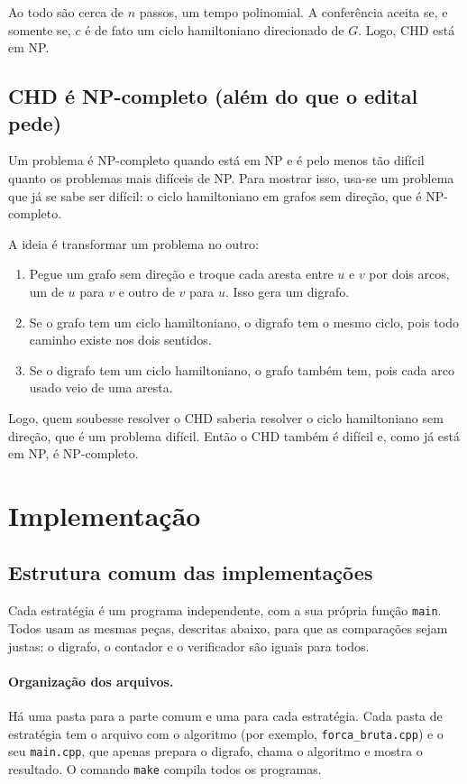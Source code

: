 \documentclass[12pt,a4paper]{article}
\begin{document}
Ao todo são cerca de $n$ passos, um tempo polinomial. A conferência aceita se, e somente se, $c$ é de fato um ciclo hamiltoniano direcionado de $G$. Logo, CHD está em NP.

\subsection{CHD é NP-completo (além do que o edital pede)}

Um problema é NP-completo quando está em NP e é pelo menos tão difícil quanto os problemas mais difíceis de NP. Para mostrar isso, usa-se um problema que já se sabe ser difícil: o ciclo hamiltoniano em grafos sem direção, que é NP-completo.

A ideia é transformar um problema no outro:

\begin{enumerate}
  \item Pegue um grafo sem direção e troque cada aresta entre $u$ e $v$ por dois arcos, um de $u$ para $v$ e outro de $v$ para $u$. Isso gera um digrafo.
  \item Se o grafo tem um ciclo hamiltoniano, o digrafo tem o mesmo ciclo, pois todo caminho existe nos dois sentidos.
  \item Se o digrafo tem um ciclo hamiltoniano, o grafo também tem, pois cada arco usado veio de uma aresta.
\end{enumerate}

Logo, quem soubesse resolver o CHD saberia resolver o ciclo hamiltoniano sem direção, que é um problema difícil. Então o CHD também é difícil e, como já está em NP, é NP-completo.

\section{Implementação}

\subsection{Estrutura comum das implementações}
\label{sec:estrutura}

Cada estratégia é um programa independente, com a sua própria função \texttt{main}. Todos usam as mesmas peças, descritas abaixo, para que as comparações sejam justas: o digrafo, o contador e o verificador são iguais para todos.

\paragraph{Organização dos arquivos.} Há uma pasta para a parte comum e uma para cada estratégia. Cada pasta de estratégia tem o arquivo com o algoritmo (por exemplo, \texttt{forca\_bruta.cpp}) e o seu \texttt{main.cpp}, que apenas prepara o digrafo, chama o algoritmo e mostra o resultado. O comando \texttt{make} compila todos os programas.
\end{document}
